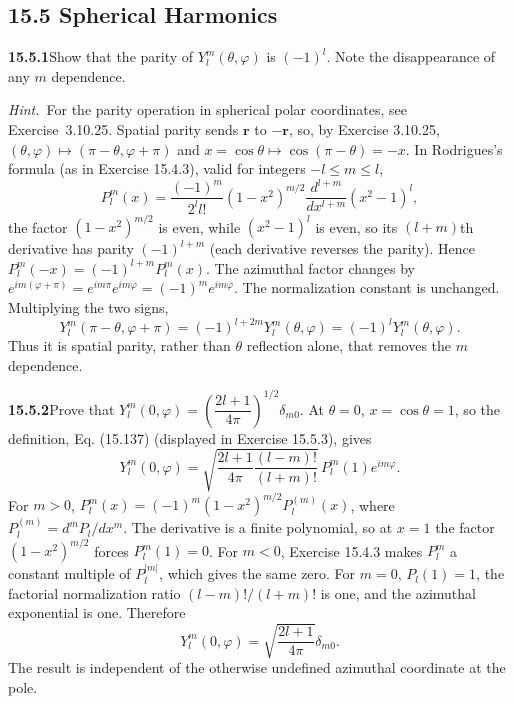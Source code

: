 \subsection*{15.5 Spherical Harmonics}

\par\bigskip
\noindent\textbf{15.5.1}\quad Show that the parity of
$Y_{l}^{m}(\theta,\varphi)$ is $(-1)^{l}$. Note the disappearance of
any $m$ dependence.
\par\emph{Hint.}~For the parity operation in spherical polar
coordinates, see Exercise~3.10.25.
\solution
Spatial parity sends $\mathbf r$ to $-\mathbf r$, so, by
Exercise 3.10.25, $(\theta,\varphi)\mapsto(\pi-\theta,\varphi+\pi)$
and $x=\cos\theta\mapsto\cos(\pi-\theta)=-x$.
In Rodrigues's formula (as in Exercise 15.4.3), valid for integers
$-l\le m\le l$,
\[
P_l^m(x)=\frac{(-1)^m}{2^ll!}(1-x^2)^{m/2}
\frac{d^{l+m}}{dx^{l+m}}(x^2-1)^l,
\]
the factor $(1-x^2)^{m/2}$ is even, while $(x^2-1)^l$ is even, so its
$(l+m)$th derivative has parity $(-1)^{l+m}$ (each derivative reverses
the parity). Hence $P_l^m(-x)=(-1)^{l+m}P_l^m(x)$.
The azimuthal factor changes by
$e^{im(\varphi+\pi)}=e^{im\pi}e^{im\varphi}=(-1)^me^{im\varphi}$.
The normalization constant is unchanged. Multiplying the two signs,
\[
\boxed{Y_l^m(\pi-\theta,\varphi+\pi)
=(-1)^{l+2m}Y_l^m(\theta,\varphi)
=(-1)^lY_l^m(\theta,\varphi)}.
\]
Thus it is spatial parity, rather than $\theta$ reflection alone,
that removes the $m$ dependence.

\par\bigskip
\noindent\textbf{15.5.2}\quad Prove that
$Y_{l}^{m}(0,\varphi)=\left(\dfrac{2l+1}{4\pi}\right)^{1/2}\delta_{m0}$.
\solution
At $\theta=0$, $x=\cos\theta=1$, so the definition, Eq. (15.137)
(displayed in Exercise 15.5.3), gives
\[
Y_l^m(0,\varphi)=\sqrt{\frac{2l+1}{4\pi}\frac{(l-m)!}{(l+m)!}}\,
P_l^m(1)e^{im\varphi}.
\]
For $m>0$, $P_l^m(x)=(-1)^m(1-x^2)^{m/2}P_l^{(m)}(x)$, where
$P_l^{(m)}=d^mP_l/dx^m$.
The derivative is a finite polynomial, so at $x=1$ the factor
$(1-x^2)^{m/2}$ forces $P_l^m(1)=0$.
For $m<0$, Exercise 15.4.3 makes $P_l^m$ a constant multiple of
$P_l^{|m|}$, which gives the same zero.
For $m=0$, $P_l(1)=1$, the factorial normalization ratio
$(l-m)!/(l+m)!$ is one, and the azimuthal exponential is one.
Therefore
\[
\boxed{Y_l^m(0,\varphi)=\sqrt{\frac{2l+1}{4\pi}}\delta_{m0}}.
\]
The result is independent of the otherwise undefined azimuthal
coordinate at the pole.

